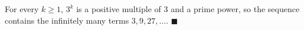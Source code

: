 For every $k\ge1$, $3^k$ is a positive multiple of $3$ and a prime power, so the sequence contains the infinitely many terms $3,9,27,\dots$. $\blacksquare$
